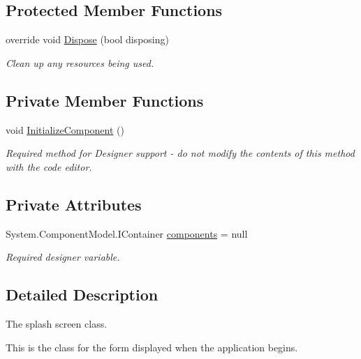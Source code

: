 \subsection*{Protected Member Functions}
\begin{DoxyCompactItemize}
\item 
override void \hyperlink{class_price___comparison_1_1_splash_form_a286ec63f21c17a78940fbe246d63534a}{Dispose} (bool disposing)
\begin{DoxyCompactList}\small\item\em Clean up any resources being used. \end{DoxyCompactList}\end{DoxyCompactItemize}
\subsection*{Private Member Functions}
\begin{DoxyCompactItemize}
\item 
void \hyperlink{class_price___comparison_1_1_splash_form_ab91707933be22a75ee960ca792b079b9}{Initialize\-Component} ()
\begin{DoxyCompactList}\small\item\em Required method for Designer support -\/ do not modify the contents of this method with the code editor. \end{DoxyCompactList}\end{DoxyCompactItemize}
\subsection*{Private Attributes}
\begin{DoxyCompactItemize}
\item 
System.\-Component\-Model.\-I\-Container \hyperlink{class_price___comparison_1_1_splash_form_af8c58b502a7449b8e1f3daa9bd15de41}{components} = null
\begin{DoxyCompactList}\small\item\em Required designer variable. \end{DoxyCompactList}\end{DoxyCompactItemize}


\subsection{Detailed Description}
The splash screen class. 

This is the class for the form displayed when the application begins. 

